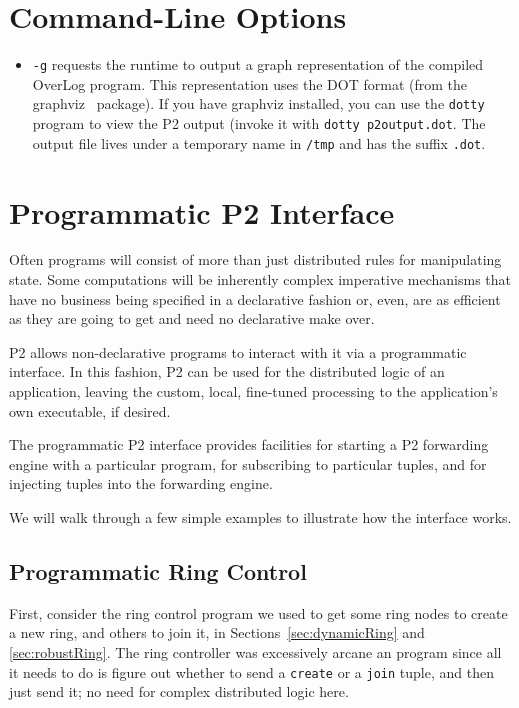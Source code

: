 \documentclass{article}
\begin{document}
\section{Command-Line Options}
\label{sec:commandLine}

\begin{itemize}
\item \texttt{-g} requests the runtime to output a graph representation
  of the compiled OverLog program. This representation uses the DOT
  format (from the graphviz~\cite{graphviz} package). If you have
  graphviz installed, you can use the \texttt{dotty} program to view the
  P2 output (invoke it with \texttt{dotty p2output.dot}.  The output file lives under a temporary name in
  \texttt{/tmp} and has the suffix \texttt{.dot}.
\end{itemize}



\section{Programmatic P2 Interface}
\label{sec:interface}

Often programs will consist of more than just distributed rules for
manipulating state. Some computations will be inherently complex
imperative mechanisms that have no business being specified in a
declarative fashion or, even, are as efficient as they are going to get
and need no declarative make over.

P2 allows  non-declarative programs to interact with it via a
programmatic interface.  In this fashion, P2 can be used for the
distributed logic of an application, leaving the custom, local,
fine-tuned processing to the application's own executable, if desired.

The programmatic P2 interface provides facilities for starting a P2
forwarding engine with a particular \ol program, for subscribing to
particular tuples, and for injecting tuples into the forwarding engine.

We will walk through a few simple examples to illustrate how the
interface works.

\subsection{Programmatic Ring Control}
First, consider the ring control \ol program we
used to get some ring nodes to create a new ring, and others to join it,
in Sections~\ref{sec:dynamicRing} and \ref{sec:robustRing}. The ring
controller was excessively arcane an \ol program since all it needs
to do is figure out whether to send a \lstinline$create$ or a
\lstinline$join$ tuple, and then just send it; no need for complex
distributed logic here.
\end{document}
